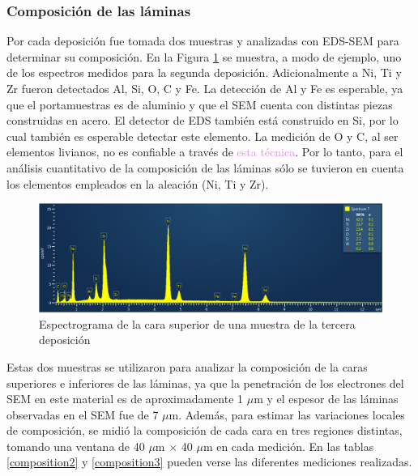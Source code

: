 \documentclass[12pt]{article}
\theoremstyle{definition}
\theoremstyle{remark}
\begin{document}
{\subsubsection{Composición de las láminas}

Por cada deposición fue tomada dos muestras y analizadas con EDS-SEM para determinar su composición. En la Figura \ref{dep2} se muestra, a modo de ejemplo, uno de los espectros medidos para la segunda deposición. Adicionalmente a Ni, Ti y Zr fueron detectados Al, Si, O, C y Fe. La detección de Al y Fe es esperable, ya que el portamuestras es de aluminio y que el SEM cuenta con distintas piezas construidas en acero. El detector de EDS también está construido en Si, por lo cual también es esperable detectar este elemento. La medición de O y C, al ser elementos livianos, no es confiable a través de \textcolor{violet}{esta técnica}. Por lo tanto, para el análisis cuantitativo de la composición de las láminas sólo se tuvieron en cuenta los elementos empleados en la aleación (Ni, Ti y Zr).

 \begin{figure}[H]
 	\centering
	\includegraphics[scale=0.5]{img/SEMAllElements.png}
 	\caption{Espectrograma de la cara superior de una muestra de la tercera deposición}
	\label{dep2}
\end{figure} 

Estas dos muestras se utilizaron para analizar la composición de la caras superiores e inferiores de las láminas, ya que la penetración de los electrones del SEM en este material es de aproximadamente 1 $\mu$m y el espesor de las láminas observadas en el SEM fue de 7 $\mu$m. Además, para estimar las variaciones locales de composición, se midió la composición de cada cara en tres regiones distintas, tomando una ventana de 40 $\mu$m $\times$ 40 $\mu$m en cada medición. En las tablas \ref{composition2} y \ref{composition3} pueden verse las diferentes mediciones realizadas.


}
\end{document}
